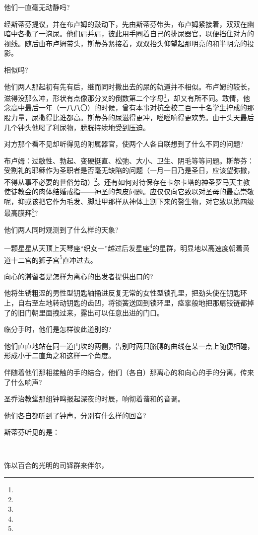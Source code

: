 \par 他们一直毫无动静吗?
\par 经斯蒂芬提议，并在布卢姆的鼓动下，先由斯蒂芬带头，布卢姆紧接着，双双在幽暗中各撒了一泡尿。他们肩并肩，彼此用手圈着自己的排尿器官，以便挡住对方的视线。随后由布卢姆带头，斯蒂芬紧接着，双双抬头仰望起那明亮的和半明亮的投影。
\par 相似吗?
\par 他们两人那起初有先有后，继而同时撒出去的尿的轨道并不相似。布卢姆的较长，滋得没那么冲，形状有点像那分叉的倒数第二个字母\footnote{}，却又有所不同。敢情，他念高中最后一年（一八八〇）的时候，曾有本事对抗全校二百一十名学生拧成的那股力量，尿撒得比谁都高。斯蒂芬的尿滋得更冲，咝咝响得更欢势。由于头天最后几个钟头他喝了利尿物，膀胱持续地受到压迫。
\par 对方那个看不见却听得见的附属器官，使两个人各自联想到了什么不同的问题?
\par 布卢姆：过敏性、勃起、变硬挺直、松弛、大小、卫生、阴毛等等问题。斯蒂芬：受割礼的耶稣作为圣职者是否毫无缺陷的问题（一月一日乃是圣日，应该望弥撒，不得从事不必要的世俗劳动）\footnote{}。还有如何对待保存在卡尔卡塔的神圣罗马天主教使徒教会的肉体结婚戒指——神圣的包皮问题。应仅仅向它致以对圣母的最高崇敬呢，抑或该把它作为毛发、脚趾甲那样从神体上割下来的赘生物，对它致以第四级最高膜拜\footnote{}?
\par 他们两人同时观测到了什么样的天象?
\par 一颗星星从天顶上天琴座“织女一”越过后发星座\footnote{}的星群，明显地以高速度朝着黄道十二宫的狮子宫\footnote{}直冲过去。
\par 向心的滞留者是怎样为离心的出发者提供出口的?
\par 他将生锈粗涩的男性型钥匙轴捅进反复无常的女性型锁孔里，把劲头使在钥匙环上，自右至左地转动钥匙的齿凹，将锁簧送回到锁环里，痉挛般地把那扇铰链都掉了的旧门朝里面拽过来，露出可以任意出进的门口。
\par 临分手时，他们是怎样彼此道别的?
\par 他们直直地站在同一道门坎的两侧，告别时两只胳膊的曲线在某一点上随便相碰，形成小于二直角之和这样一个角度。
\par 伴随着他们那相接触的手的结合，他们（各自）那离心的和向心的手的分离，传来了什么响声?
\par 圣乔治教堂那组钟鸣报起深夜的时辰，响彻着谐和的音调。
\par 他们各自都听到了钟声，分别有什么样的回音?
\par 斯蒂芬听见的是：
\par  
\par 饰以百合的光明的司铎群来伴尔，
